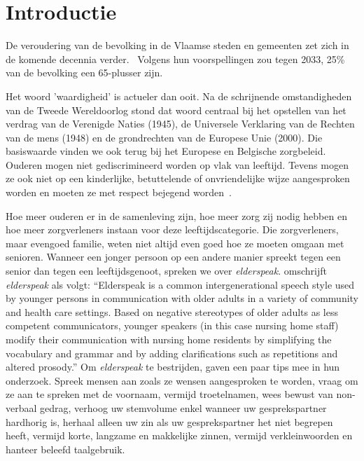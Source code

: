 

\section{Introductie}\label{sec:introductie} %

De veroudering van de bevolking in de Vlaamse steden en gemeenten zet zich in de komende  decennia verder.~\autocite{StatistiekVlaanderen2018}
Volgens hun voorspellingen zou tegen 2033, 25\% van de bevolking een 65-plusser zijn.

Het woord 'waardigheid' is actueler dan ooit.
Na de schrijnende omstandigheden van de Tweede Wereldoorlog stond dat woord centraal bij het opstellen van het verdrag van de Verenigde Naties (1945), de Universele Verklaring van de Rechten van de mens (1948) en de grondrechten van de Europese Unie (2000).
Die basiswaarde vinden we ook terug bij het Europese en Belgische zorgbeleid. Ouderen mogen niet gediscrimineerd worden op vlak van leeftijd. Tevens mogen ze ook niet op een kinderlijke, betuttelende of onvriendelijke wijze aangesproken worden en moeten ze met respect bejegend worden~\autocite{Campens}.

Hoe meer ouderen er in de samenleving zijn, hoe meer zorg zij nodig hebben en hoe meer zorgverleners instaan voor deze leeftijdscategorie.
Die zorgverleners, maar evengoed familie, weten niet altijd even goed hoe ze moeten omgaan met senioren.
Wanneer een jonger persoon op een andere manier spreekt tegen een senior dan tegen een leeftijdsgenoot, spreken we over \textit{elderspeak}. \textcite{Williams2011} omschrijft \textit{elderspeak} als volgt: ``Elderspeak is a common intergenerational speech style used by younger persons in communication with older adults in a variety of community and health care settings. Based on negative stereotypes of older adults as less competent communicators, younger speakers (in this case nursing home staff) modify their communication with nursing home residents by simplifying the vocabulary and grammar and by adding clarifications such as repetitions and altered prosody.'' Om \textit{elderspeak} te bestrijden, gaven \textcite{Wick2007} een paar tips mee in hun onderzoek.
Spreek mensen aan zoals ze wensen aangesproken te worden, vraag om ze aan te spreken met de voornaam, vermijd troetelnamen, wees bewust van non-verbaal gedrag, verhoog uw stemvolume enkel wanneer uw gesprekspartner hardhorig is, herhaal alleen uw zin als uw gesprekspartner het niet begrepen heeft, vermijd korte, langzame en makkelijke zinnen, vermijd verkleinwoorden en hanteer beleefd taalgebruik.

